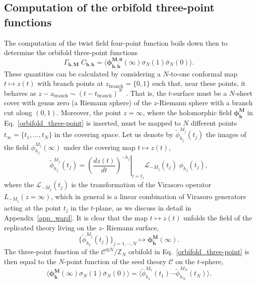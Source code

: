 \documentclass[a4paper,11pt]{article}
\begin{document}
\subsection{Computation of the orbifold three-point functions}
The computation of the twist field four-point function boils down then to determine the 
orbifold three-point functions
\begin{equation}\label{orbifold_three-point}
 \Gamma_{\boldsymbol{h},\boldsymbol{M}} \;C_{\boldsymbol{h},\boldsymbol{h}} = \langle \boldsymbol{\phi}^{\boldsymbol{M},\boldsymbol{0}}_{\boldsymbol{h},\boldsymbol{\bar{h}}}(\infty) \sigma_{N}(1)\bar{\sigma}_{N}(0)\rangle.
\end{equation}
These quantities can be calculated by considering a $N$-to-one conformal map
$t\mapsto z(t)$ with branch points at $z_{\text{branch}}=\{0, 1\}$ such that, 
near these points, it behaves as $z-z_{\text{branch}}\sim (t-t_{\text{branch}})^N$~\cite{Lunin}.
That is, the $t$-surface must be a $N$-sheet cover with genus zero (a Riemann sphere) of the $z$-Riemann sphere with a branch cut along 
$(0,1)$.  Moreover, the point $z=\infty$, where the holomorphic field $\boldsymbol{\phi}^{\boldsymbol{M}}_{\boldsymbol{h}}$
in Eq.~\eqref{orbifold_three-point} is inserted, must be mapped to $N$ different points $t_\infty=\{t_1, \dots, t_N\}$ in 
the covering space. Let us denote by $\tilde{\phi}_{h_j}^{M_j}(t_j)$ the images
of the field $\phi_{h_j}^{M_j}(\infty)$ under the covering map $t\mapsto z(t)$,
\begin{equation}
\label{Jac}
\tilde{\phi}_{h_j}^{M_j}(t_j) = \left.\left(\frac{d z(t)}{d t}
 \right)^{-h_j}\right|_{t=t_j} \mathcal{L}_{-M_j}(t_j)\;\phi_{h_j} (t_j),
\end{equation}
where the $\mathcal{L}_{-M_j}(t_j)$ is the transformation of the Virasoro operator
$L_{-M_j}(z=\infty)$, which in general is a linear combination of Virasoro generators
acting at the point $t_j$ in the $t$-plane, as we discuss in detail in Appendix~\ref{app_ward}.
It is clear that the map $t\mapsto z(t)$ unfolds the field of the replicated theory living on the $z$- Riemann surface,
\begin{equation}
\{\tilde{\phi}_{h_j}^{M_j}(t_j)\}_{j=1,\cdots,N}\mapsto \boldsymbol{\phi}_{\boldsymbol{h}}^{\boldsymbol{M}}(\infty).
\end{equation}
The three-point function of the $\mathcal{C}^{\otimes N}/\mathbb{Z}_N$ orbifold in Eq.~\eqref{orbifold_three-point}
is then equal to the $N$-point function of the seed theory $\mathcal{C}$ on the $t$-sphere,
\begin{equation}\label{N-point}
\langle \boldsymbol{\phi}^{\boldsymbol{M}}_{\boldsymbol{h}}(\infty) \sigma_{N}(1)\bar{\sigma}_{N}(0)\rangle=\langle \tilde{\phi}^{M_1}_{h_1}(t_1)\cdots\tilde{\phi}_{h_N}^{M_N}(t_N)\rangle.
\end{equation}
\end{document}
